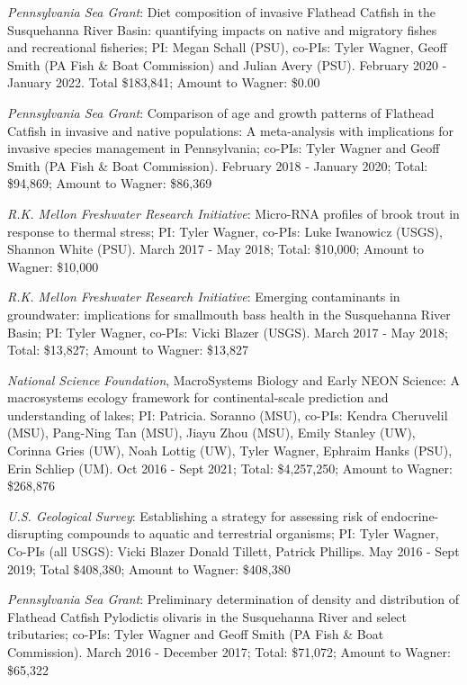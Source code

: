 \documentclass[10pt]{article}
\begin{document}
\begin{flushleft}
\begin{etaremune}
\item  {\sl Pennsylvania Sea Grant}: Diet composition of invasive Flathead Catfish in the Susquehanna River Basin: quantifying impacts on native and migratory fishes and recreational fisheries; PI: Megan Schall (PSU), co-PIs: Tyler Wagner, Geoff Smith (PA Fish \& Boat Commission) and Julian Avery (PSU). February 2020 - January 2022. Total \$183,841; Amount to Wagner: \$0.00

\item {\sl Pennsylvania Sea Grant}: Comparison of age and growth patterns of Flathead Catfish in invasive and native populations: A meta-analysis with implications for invasive species management in Pennsylvania; co-PIs: Tyler Wagner and Geoff Smith (PA Fish \& Boat Commission). February 2018 - January 2020; Total: \$94,869;  Amount to Wagner: \$86,369

\item {\sl  R.K. Mellon Freshwater Research Initiative}: Micro-RNA profiles of brook trout in response to thermal stress; PI: Tyler Wagner, co-PIs: Luke Iwanowicz (USGS), Shannon White (PSU). March 2017 - May 2018; Total: \$10,000; Amount to Wagner: \$10,000

\item {\sl  R.K. Mellon Freshwater Research Initiative}: Emerging contaminants in groundwater: implications for smallmouth bass health in the Susquehanna River Basin; PI: Tyler Wagner, co-PIs: Vicki Blazer (USGS). March 2017 - May 2018; Total: \$13,827; Amount to Wagner: \$13,827

\item {\sl National Science Foundation}, MacroSystems Biology and Early NEON Science: A macrosystems ecology framework for continental-scale prediction and understanding of lakes; PI: Patricia. Soranno (MSU), co-PIs: Kendra Cheruvelil (MSU), Pang-Ning Tan (MSU), Jiayu Zhou (MSU), Emily Stanley (UW), Corinna Gries (UW), Noah Lottig (UW), Tyler Wagner, Ephraim Hanks (PSU), Erin Schliep (UM). Oct 2016 - Sept 2021; Total: \$4,257,250; Amount to Wagner: \$268,876

\item {\sl U.S. Geological Survey}: Establishing a strategy for assessing risk of endocrine-disrupting compounds to aquatic and terrestrial organisms; PI: Tyler Wagner, Co-PIs (all USGS): Vicki Blazer Donald Tillett, Patrick Phillips. May 2016 - Sept 2019; Total \$408,380;  Amount to Wagner: \$408,380

\item {\sl Pennsylvania Sea Grant}: Preliminary determination of density and distribution of Flathead Catfish Pylodictis olivaris in the Susquehanna River and select tributaries; co-PIs: Tyler Wagner and Geoff Smith (PA Fish \& Boat Commission). March 2016 - December 2017; Total: \$71,072;  Amount to Wagner: \$65,322


\end{etaremune}
\end{flushleft}
\end{document}
